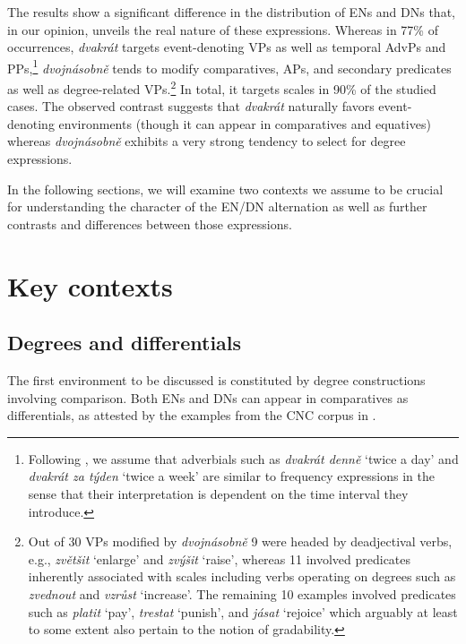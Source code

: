 \documentclass[output=paper,
modfonts,
hidelinks,
newtxmath
]{langscibook}
\begin{document}
\noindent The results show a significant difference in the distribution of ENs and DNs that, in our opinion, unveils the real nature of these expressions. Whereas in 77\% of occurrences, \textit{dvakrát} targets event-denoting VPs as well as temporal AdvPs and PPs,\footnote{Following \cite{doetjes_adverbs_2007}, we assume that adverbials such as \textit{dvakrát denně} `twice a day' and \textit{dvakrát za týden} `twice a week' are similar to frequency expressions in the sense that their interpretation is dependent on the time interval they introduce.} \textit{dvojnásobně} tends to modify comparatives, APs, and secondary predicates as well as degree-related VPs.\footnote{Out of 30 VPs modified by \textit{dvojnásobně} 9 were headed by deadjectival verbs, e.g., \textit{zvětšit} `enlarge' and \textit{zvýšit} `raise', whereas 11 involved predicates inherently associated with scales including verbs operating on degrees such as \textit{zvednout} and \textit{vzrůst} `increase'. The remaining 10 examples involved predicates such as \textit{platit} `pay', \textit{trestat} `punish', and \textit{jásat} `rejoice' which arguably at least to some extent also pertain to the notion of gradability.} In total, it targets scales in 90\% of the studied cases. The observed contrast suggests that \textit{dvakrát} naturally favors event-denoting environments (though it can appear in comparatives and equatives) whereas \textit{dvoj\-násobně} exhibits a very strong tendency to select for degree expressions.

In the following sections, we will examine two contexts we assume to be crucial for understanding the character of the EN/DN alternation as well as further contrasts and differences between those expressions.

\section{Key contexts}\label{key-contexts}

\subsection{Degrees and differentials}\label{degrees-and-differentials}

The first environment to be discussed is constituted by degree constructions involving comparison. Both ENs and DNs can appear in comparatives as differentials, as attested by the examples from the CNC corpus in .
\end{document}
